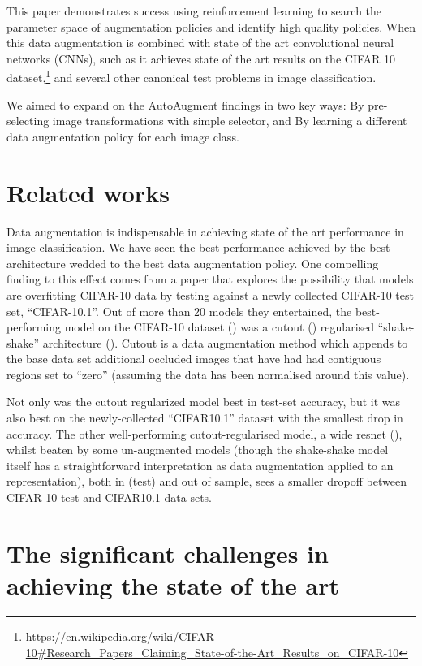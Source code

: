 \documentclass[10pt,twocolumn,letterpaper]{article}
\begin{document}
  This paper demonstrates success using reinforcement learning to search the parameter space of augmentation policies and identify high quality policies. When this data augmentation is combined with state of the art convolutional neural networks (CNNs), such as \cite{Yamada2018} it achieves state of the art results on the CIFAR 10 dataset,\footnote{\url{https://en.wikipedia.org/wiki/CIFAR-10\#Research\_Papers\_Claiming\_State-of-the-Art\_Results\_on\_CIFAR-10}} and several other canonical test problems in image classification.

  We aimed to expand on the AutoAugment findings in two key ways:
  By pre-selecting image transformations with simple selector, and
  By learning a different data augmentation policy for each image class.

\section{Related works}

  Data augmentation is indispensable in achieving state of the art performance in image classification. We have seen the best performance achieved by the best architecture wedded to the best data augmentation policy. One compelling finding to this effect comes from a paper that explores the possibility that models are overfitting CIFAR-10 data\cite{Recht2018} by testing against a newly collected CIFAR-10 test set, ``CIFAR-10.1''. Out of more than 20 models they entertained, the best-performing model on the CIFAR-10 dataset (\cite{Krizhevsky2009}) was a cutout (\cite{Devries2017}) regularised ``shake-shake'' architecture (\cite{Gastaldi2017}). Cutout is a data augmentation method which appends to the base data set additional occluded images that have had had contiguous regions set to ``zero'' (assuming the data has been normalised around this value).

  Not only was the cutout regularized model best in test-set accuracy, but it was also best on the newly-collected ``CIFAR10.1'' dataset \cite{Recht2018} with the smallest drop in accuracy. The other well-performing cutout-regularised model, a wide resnet (\cite{Zagoruyko2016}), whilst beaten by some un-augmented models (though the shake-shake model itself has a straightforward interpretation as data augmentation applied to an representation), both in (test) and out of sample, sees a smaller dropoff between CIFAR 10 test and CIFAR10.1 data sets.

\section{The significant challenges in achieving the state of the art}
\end{document}
